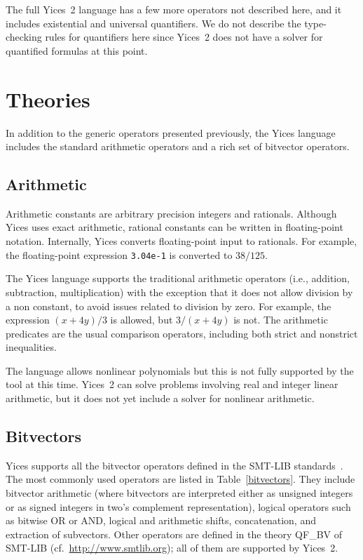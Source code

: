 \documentclass[11pt,twoside,fleqn,openright,titlepage]{cslreport}
\begin{document}
\medskip\noindent
The full Yices~2 language has a few more operators not described here,
and  it includes  existential  and universal  quantifiers.  We do  not
describe the  type-checking rules  for quantifiers here  since Yices~2
does not have a solver for quantified formulas at this point.


\section{Theories}

In addition  to the generic operators presented  previously, the Yices
language includes the standard arithmetic  operators and a rich set of
bitvector operators.

\subsection{Arithmetic}

Arithmetic constants  are arbitrary precision integers  and rationals.
Although  Yices  uses  exact  arithmetic, rational  constants  can  be
written  in  floating-point   notation.   Internally,  Yices  converts
floating-point input  to rationals.   For example,  the floating-point
expression \texttt{3.04e-1} is converted to $38/125$.

\medskip\noindent
The  Yices  language  supports  the traditional  arithmetic  operators
(i.e., addition, subtraction,  multiplication) with the exception that
it does not allow division by  a non constant, to avoid issues related
to  division by  zero. For  example, the  expression $(x  +  4y)/3$ is
allowed, but  $3/(x + 4y)$ is  not. The arithmetic  predicates are the
usual  comparison  operators,  including  both  strict  and  nonstrict
inequalities.

\medskip\noindent
The  language  allows nonlinear  polynomials  but  this  is not  fully
supported  by  the tool  at  this  time.  Yices~2 can  solve  problems
involving  real and  integer linear  arithmetic, but  it does  not yet
include a solver for nonlinear arithmetic.


\subsection{Bitvectors}
\label{bitvector-general}

Yices supports all the bitvector operators defined in the SMT-LIB
standards~\cite{SMTLIB12:2006,SMTLIB20:2012}.  The most commonly used
operators are listed in Table~\ref{bitvectors}.  They include
bitvector arithmetic (where bitvectors are interpreted either as
unsigned integers or as signed integers in two's complement
representation), logical operators such as bitwise OR or AND, logical
and arithmetic shifts, concatenation, and extraction of
subvectors. Other operators are defined in the theory QF\_BV of
SMT-LIB (cf.~\url{http://www.smtlib.org}); all of them are supported
by Yices~2.
\end{document}
